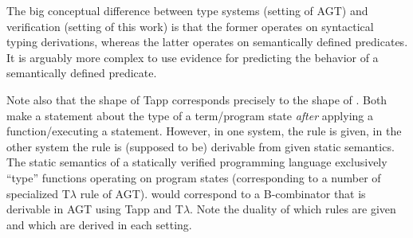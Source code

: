 The big conceptual difference between type systems (setting of AGT) and verification (setting of this work) is that the former operates on syntactical typing derivations, whereas the latter operates on semantically defined predicates.
It is arguably more complex to use evidence for predicting the behavior of a semantically defined predicate.

Note also that the shape of Tapp corresponds precisely to the shape of .
Both make a statement about the type of a term/program state \emph{after} applying a function/executing a statement.
However, in one system, the rule is given, in the other system the rule is (supposed to be) derivable from given static semantics.
The static semantics of a statically verified programming language exclusively “type” functions operating on program states (corresponding to a number of specialized T$\lambda$ rule of AGT).
 would correspond to a B-combinator that is derivable in AGT using Tapp and T$\lambda$.
Note the duality of which rules are given and which are derived in each setting.



